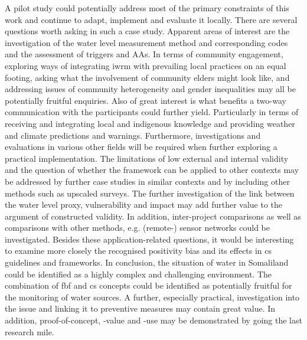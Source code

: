 A pilot study could potentially address most of the primary constraints of this work and continue to adapt, implement and evaluate it locally. There are several questions worth asking in such a case study. Apparent areas of interest are the investigation of the water level measurement method and corresponding codes and the assessment of triggers and AAs. In terms of community engagement, exploring ways of integrating \acrlong{iwrm} with prevailing local practices on an equal footing, asking what the involvement of community elders might look like, and addressing issues of community heterogeneity and gender inequalities may all be potentially fruitful enquiries. Also of great interest is what benefits a two-way communication with the participants could further yield. Particularly in terms of receiving and integrating local and indigenous knowledge and providing weather and climate predictions and warnings. Furthermore, investigations and evaluations in various other fields will be required when further exploring a practical implementation.\newline
The limitations of low external and internal validity and the question of whether the framework can be applied to other contexts may be addressed by further case studies in similar contexts and by including other methods such as upscaled surveys. The further investigation of the link between the water level proxy, vulnerability and impact may add further value to the argument of constructed validity. In addition, inter-project comparisons as well as comparisons with other methods, e.g. (remote-) sensor networks could be investigated. Besides these application-related questions, it would be interesting to examine more closely the recognised positivity bias and its effects in \acrlong{cs} guidelines and frameworks.\newline
In conclusion, the situation of water in Somaliland could be identified as a highly complex and challenging environment. The combination of \acrlong{fbf} and \acrlong{cs} concepts could be identified as potentially fruitful for the monitoring of water sources. A further, especially practical, investigation into the issue and linking it to preventive measures may contain great value. In addition, proof-of-concept, -value and -use may be demonstrated by going the last research mile. 




